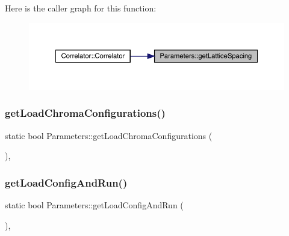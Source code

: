 Here is the caller graph for this function\+:\nopagebreak
\begin{figure}[H]
\begin{center}
\leavevmode
\includegraphics[width=350pt]{class_parameters_aabe7e3a2468cf11bb5e98e626cb94ff2_icgraph}
\end{center}
\end{figure}
\mbox{\label{class_parameters_a35eef818713a6f5ae20d67e7d64bec2f}} 
\subsubsection{\texorpdfstring{getLoadChromaConfigurations()}{getLoadChromaConfigurations()}}
{\footnotesize\ttfamily static bool Parameters\+::get\+Load\+Chroma\+Configurations (\begin{DoxyParamCaption}{ }\end{DoxyParamCaption})\hspace{0.3cm}{\ttfamily [inline]}, {\ttfamily [static]}}

\mbox{\label{class_parameters_a7870fae41b172caee9fa020c86d056ac}} 
\subsubsection{\texorpdfstring{getLoadConfigAndRun()}{getLoadConfigAndRun()}}
{\footnotesize\ttfamily static bool Parameters\+::get\+Load\+Config\+And\+Run (\begin{DoxyParamCaption}{ }\end{DoxyParamCaption})\hspace{0.3cm}{\ttfamily [inline]}, {\ttfamily [static]}}

